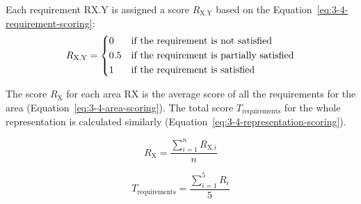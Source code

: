 Each requirement RX.Y is assigned a score $R_{\text{X.Y}}$ based on the Equation~\ref{eq:3-4-requirement-scoring}:
\begin{equation}
    R_{\text{X.Y}} =
    \begin{dcases}
        0   & \text{if the requirement is not satisfied}\\
        0.5 & \text{if the requirement is partially satisfied}\\
        1   & \text{if the requirement is satisfied}
    \end{dcases}
    \label{eq:3-4-requirement-scoring}
\end{equation}

The score $R_{\text{X}}$ for each area RX is the average score of all the requirements for the area (Equation~\ref{eq:3-4-area-scoring}).
The total score $T_{\text{requirements}}$ for the whole representation is calculated similarly (Equation~\ref{eq:3-4-representation-scoring}).

\begin{equation}
    R_{\text{X}} = \frac{\sum_{i=1}^{n} R_{\text{X.$i$}}}{n}
    \label{eq:3-4-area-scoring}
\end{equation}

\begin{equation}
    T_{\text{requirements}} = \frac{\sum_{i=1}^{5} R_i}{5}
    \label{eq:3-4-representation-scoring}
\end{equation}

